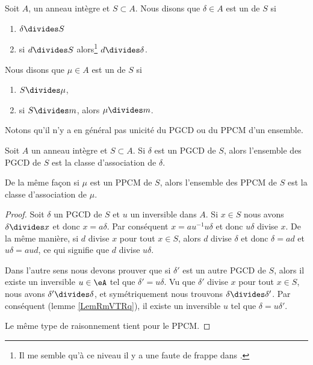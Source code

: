 \begin{definition}\label{DefrYwbct}
    Soit \( A\), un anneau intègre et \( S\subset A\). Nous disons que \( \delta\in A\) est un  de \( S\) si
    \begin{enumerate}
        \item
            \( \delta\divides S\)
        \item
            si \( d\divides S\) alors\footnote{Il me semble qu'à ce niveau il y a une faute de frappe dans \cite{XPXxPl}.} \( d\divides \delta\).
    \end{enumerate}
    Nous disons que \( \mu\in A\) est un  de \( S\) si
    \begin{enumerate}
        \item
            \( S\divides \mu\),
        \item
            si \( S\divides m\), alors \( \mu\divides m\).
    \end{enumerate}
\end{definition}
Notons qu'il n'y a en général pas unicité du PGCD ou du PPCM d'un ensemble.

\begin{lemma}
    Soit \( A\) un anneau intègre et \( S\subset A\). Si \( \delta\) est un PGCD de \( S\), alors l'ensemble des PGCD de \( S\) est la classe d'association de \( \delta\).

    De la même façon si \( \mu\) est un PPCM de \( S\), alors l'ensemble des PPCM de \( S\) est la classe d'association de \( \mu\).
\end{lemma}

\begin{proof}
    Soit \( \delta\) un PGCD de \( S\) et \( u\) un inversible dans \( A\). Si \( x\in S\) nous avons \( \delta\divides x\) et donc \( x=a\delta\). Par conséquent \( x=au^{-1}u\delta\) et donc \( u\delta\) divise \( x\). De la même manière, si \( d\) divise \( x\) pour tout \( x\in S\), alors \( d\) divise \( \delta\) et donc \( \delta=ad\) et \( u\delta=aud\), ce qui signifie que \( d\) divise \( u\delta\).

    Dans l'autre sens nous devons prouver que si \( \delta'\) est un autre PGCD de \( S\), alors il existe un inversible \( u\in \eA\) tel que \( \delta'=u\delta\). Vu que \( \delta'\) divise \( x\) pour tout \( x\in S\), nous avons \( \delta'\divides \delta\), et symétriquement nous trouvons \( \delta\divides\delta'\). Par conséquent (lemme \ref{LemRmVTRq}), il existe un inversible \( u\) tel que \( \delta=u\delta'\).

    Le même type de raisonnement tient pour le PPCM.
\end{proof}

